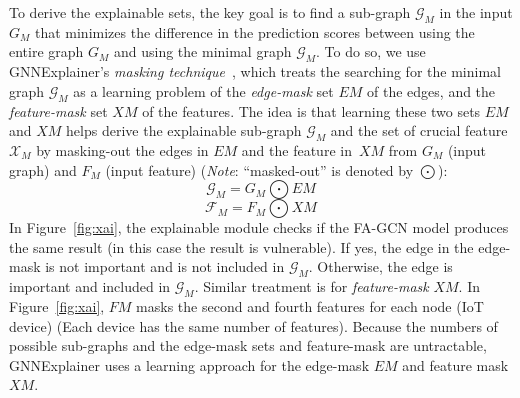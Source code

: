 To derive the explainable sets, the key goal is to find a sub-graph
$\mathcal{G}_M$ in the input $G_M$ that minimizes the
difference in the prediction scores between using the entire graph
$G_M$ and using the minimal graph $\mathcal{G}_M$. To do so, we use
GNNExplainer's {\em masking technique}~\cite{GNNExplainer},
which treats the searching for the minimal graph $\mathcal{G}_M$ as a
learning problem of the {\em edge-mask} set $EM$ of the edges,
and the {\em feature-mask} set $XM$ of the features.
The idea is that learning these two sets $EM$ and $XM$
helps {\tool} derive the explainable sub-graph $\mathcal{G}_M$
and the set of crucial feature $\mathcal{X}_M$
by masking-out the edges in $EM$
and the feature in~$XM$ from $G_M$ (input graph) and $F_M$ (input feature)
({\em Note}: ``masked-out'' is denoted by $\bigodot$):
\begin{equation}\label{eq:11}
\mathcal{G}_M = G_M \bigodot EM
\end{equation}
\begin{equation}
\mathcal{F}_M = F_M \bigodot XM
\end{equation}
In Figure~\ref{fig:xai}, the explainable module checks if the FA-GCN model produces the same result (in this case the result is
vulnerable). If yes, the edge in the edge-mask is not important and
is not included in $\mathcal{G}_M$. Otherwise, the edge is important
and included in $\mathcal{G}_M$.
Similar treatment is for {\em feature-mask} $XM$. In
Figure~\ref{fig:xai}, $FM$ masks the second and fourth features for
each node (IoT device) (Each device has the same number of
features).
Because the numbers of possible sub-graphs and the edge-mask sets
and feature-mask
are untractable, GNNExplainer uses a learning approach for the
edge-mask $EM$ and feature mask $XM$.

